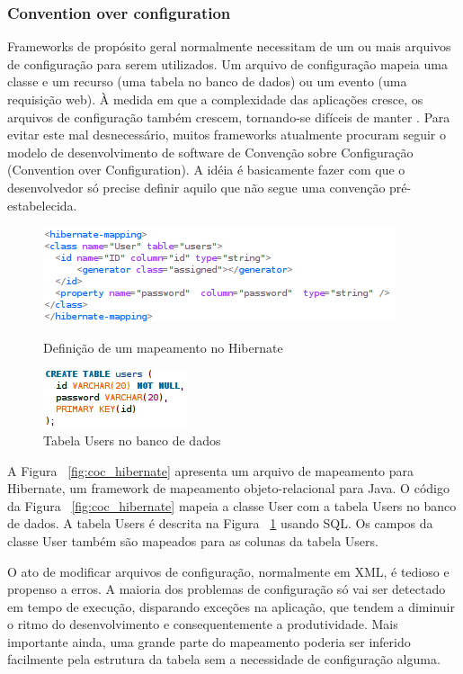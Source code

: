 \subsubsection{Convention over configuration}
Frameworks de propósito geral normalmente necessitam de um ou mais arquivos de configuração
para serem utilizados. Um arquivo de configuração mapeia uma classe e um recurso (uma tabela
no banco de dados) ou um evento (uma requisição web). À medida em que a complexidade das
aplicações cresce, os arquivos de configuração também crescem, tornando-se difíceis de manter \cite{Chen}. 
Para evitar este mal desnecessário, muitos frameworks atualmente procuram seguir o modelo
de desenvolvimento de software de Convenção sobre Configuração (Convention over Configuration).
A idéia é basicamente fazer com que o desenvolvedor só precise definir aquilo que não segue 
uma convenção pré-estabelecida. 

\begin{figure}[!htbp]
\begin{minipage}[t]{0.5\linewidth}
\includegraphics[scale=0.75]{fig/coc_hibernate.png}
\caption{Definição de um mapeamento no Hibernate}\label{fig:coc_hibernate}
\end{minipage} \hfill
\begin{minipage}[t]{0.3\linewidth}
\includegraphics[scale=0.75]{fig/coc_tabela.png}
\caption{Tabela Users no banco de dados}\label{fig:coc_tabela}
\end{minipage}
\end{figure}

A Figura ~\ref{fig:coc_hibernate} apresenta um arquivo de mapeamento para Hibernate,
um framework de mapeamento objeto-relacional para Java. O código da Figura ~\ref{fig:coc_hibernate}
mapeia a classe User com a tabela Users no banco de dados. A tabela Users é descrita 
na Figura ~\ref{fig:coc_tabela} usando SQL. Os campos da classe User também são mapeados
para as colunas da tabela Users.

O ato de modificar arquivos de configuração, normalmente em XML, é tedioso e propenso
a erros. A maioria dos problemas de configuração só vai ser detectado em tempo de execução,
disparando exceções na aplicação, que tendem a diminuir o ritmo do desenvolvimento e 
consequentemente a produtividade. Mais importante ainda, uma grande parte do
mapeamento poderia ser inferido facilmente pela estrutura da tabela sem a necessidade
de configuração alguma. 

